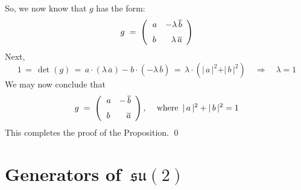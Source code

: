So, we now know that $g$ has the form:
\begin{equation*}
g
\; = \;
	\left(\begin{array}{rr}
		a & -\lambda\,\overline{b}
		\\
		\overset{{\color{white}-}}{b} & \lambda\,\overline{a}
		\end{array}\right)
\end{equation*}
Next,
\begin{equation*}
1
\,=\, \det(g)
\,=\, a\cdot(\lambda\,\overline{a}) - b \cdot (-\lambda\,\overline{b})
\,=\, \lambda\cdot(\vert\,a\,\vert^{2} + \vert\,b\,\vert^{2})
\quad\Longrightarrow\quad
	\lambda = 1
\end{equation*}
We may now conclude that
\begin{equation*}
g
\; = \;
	\left(\begin{array}{rr}
		a & -\,\overline{b}
		\\
		\overset{{\color{white}-}}{b} & \overline{a}
		\end{array}\right),\,
\quad
\textnormal{where \,$\vert\,a\,\vert^{2} + \vert\,b\,\vert^{2} = 1$}
\end{equation*}
This completes the proof of the Proposition.
\qed


\section{Generators of \,$\mathfrak{su}(2)$}



